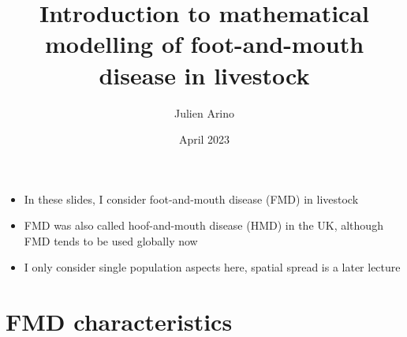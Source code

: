 \documentclass[aspectratio=43]{beamer}
\title{Introduction to mathematical modelling of foot-and-mouth disease in livestock}
\author{Julien Arino}
\date{April 2023}
\begin{document}

\begin{frame}
  \titlepage
\end{frame}
\addtocounter{page}{-1}


\begin{frame}
\begin{itemize}
  \item In these slides, I consider foot-and-mouth disease (FMD) in livestock
  \vfill
  \item FMD was also called hoof-and-mouth disease (HMD) in the UK, although FMD tends to be used globally now
  \vfill
  \item I only consider single population aspects here, spatial spread is a later lecture
\end{itemize}
\end{frame}


\section{FMD characteristics}
\end{document}
